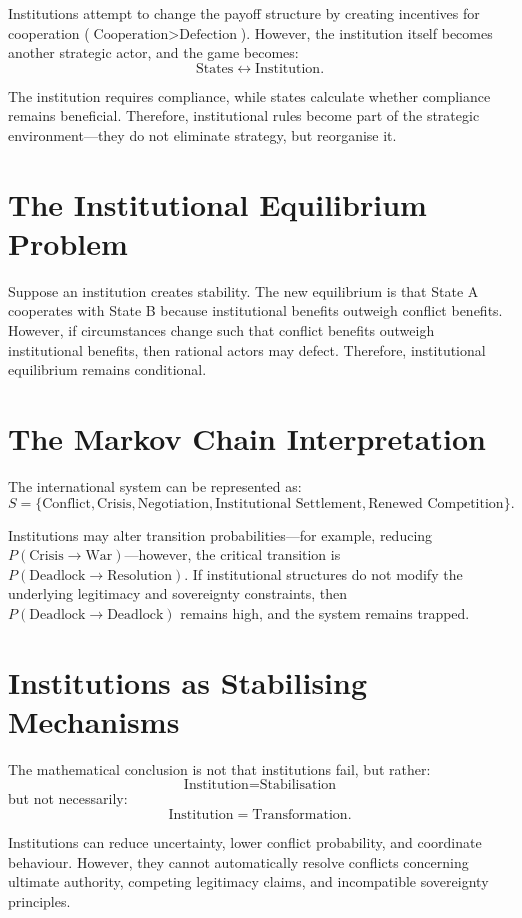 \documentclass[11pt,openany]{book}
\theoremstyle{plain}
\theoremstyle{definition}
\begin{document}
Institutions attempt to change the payoff structure by creating incentives for cooperation (\(\text{Cooperation} > \text{Defection}\)). However, the institution itself becomes another strategic actor, and the game becomes:
\[
\text{States} \longleftrightarrow \text{Institution}.
\]

The institution requires compliance, while states calculate whether compliance remains beneficial. Therefore, institutional rules become part of the strategic environment—they do not eliminate strategy, but reorganise it.

\section*{The Institutional Equilibrium Problem}

Suppose an institution creates stability. The new equilibrium is that State A cooperates with State B because institutional benefits outweigh conflict benefits. However, if circumstances change such that conflict benefits outweigh institutional benefits, then rational actors may defect. Therefore, institutional equilibrium remains conditional.

\section*{The Markov Chain Interpretation}

The international system can be represented as:
\[
S = \{\text{Conflict}, \text{Crisis}, \text{Negotiation}, \text{Institutional Settlement}, \text{Renewed Competition}\}.
\]

Institutions may alter transition probabilities—for example, reducing \(P(\text{Crisis} \to \text{War})\)—however, the critical transition is \(P(\text{Deadlock} \to \text{Resolution})\). If institutional structures do not modify the underlying legitimacy and sovereignty constraints, then \(P(\text{Deadlock} \to \text{Deadlock})\) remains high, and the system remains trapped.

\section*{Institutions as Stabilising Mechanisms}

The mathematical conclusion is not that institutions fail, but rather:
\[
\text{Institution} = \text{Stabilisation}
\]
but not necessarily:
\[
\text{Institution} = \text{Transformation}.
\]

Institutions can reduce uncertainty, lower conflict probability, and coordinate behaviour. However, they cannot automatically resolve conflicts concerning ultimate authority, competing legitimacy claims, and incompatible sovereignty principles.
\end{document}
